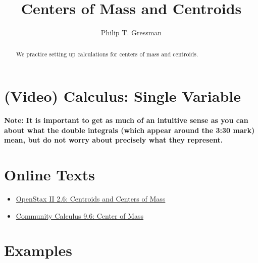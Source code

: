 \documentclass{ximera}
\title{Centers of Mass and Centroids}
\author{Philip T. Gressman}
\begin{document}
\begin{abstract}
We practice setting up calculations for centers of mass and centroids.
\end{abstract}
\maketitle

\section*{(Video) Calculus: Single Variable}
\textbf{Note: It is important to get as much of an intuitive sense as you can about what the double integrals (which appear around the 3:30 mark) mean, but do not worry about precisely what they represent.}

\section*{Online Texts}
\begin{itemize}
\item \href{https://openstax.org/books/calculus-volume-2/pages/2-6-moments-and-centers-of-mass}{OpenStax II 2.6: Centroids and Centers of Mass}
\item \href{https://www.whitman.edu/mathematics/calculus_online/section09.06.html}{Community Calculus 9.6: Center of Mass}
\end{itemize}

\section*{Examples}
\end{document}
